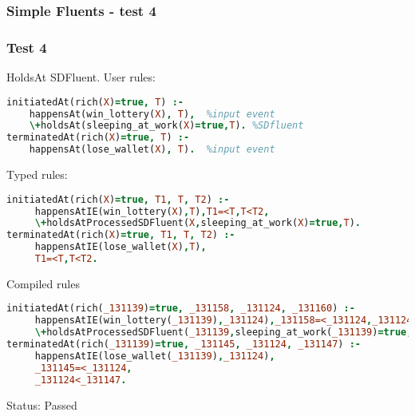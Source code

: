 \documentclass[8pt]{beamer}
\begin{document}
\begin{frame}[fragile]
\frametitle{Simple Fluents - test 4}
\subsubsection{Test 4}
\small
HoldsAt SDFluent.\linebreak
User rules:
\begin{tiny}
\begin{lstlisting}[language=Prolog]
initiatedAt(rich(X)=true, T) :-
    happensAt(win_lottery(X), T),  %input event
    \+holdsAt(sleeping_at_work(X)=true,T). %SDfluent
terminatedAt(rich(X)=true, T) :-
    happensAt(lose_wallet(X), T).  %input event
\end{lstlisting}
\end{tiny}
Typed rules:
\begin{tiny}
\begin{lstlisting}[language=Prolog]
initiatedAt(rich(X)=true, T1, T, T2) :-
     happensAtIE(win_lottery(X),T),T1=<T,T<T2,
     \+holdsAtProcessedSDFluent(X,sleeping_at_work(X)=true,T).
terminatedAt(rich(X)=true, T1, T, T2) :-
     happensAtIE(lose_wallet(X),T),
     T1=<T,T<T2.
\end{lstlisting}
\end{tiny}
Compiled rules
\begin{tiny}
\begin{lstlisting}[language=Prolog]
initiatedAt(rich(_131139)=true, _131158, _131124, _131160) :-
     happensAtIE(win_lottery(_131139),_131124),_131158=<_131124,_131124<_131160,
     \+holdsAtProcessedSDFluent(_131139,sleeping_at_work(_131139)=true,_131124).
terminatedAt(rich(_131139)=true, _131145, _131124, _131147) :-
     happensAtIE(lose_wallet(_131139),_131124),
     _131145=<_131124,
     _131124<_131147.
\end{lstlisting}
\end{tiny}
Status: Passed
\end{frame}
\end{document}

